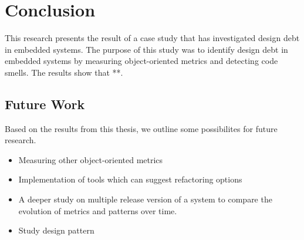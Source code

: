 
\chapter{Conclusion}
This research presents the result of a case study that has investigated design debt in embedded systems. The purpose of this study was to identify design debt in embedded systems by measuring object-oriented metrics and detecting code smells. The results show that **. 

\section{Future Work}
Based on the results from this thesis, we outline some possibilites for future research.

\begin{itemize}
	\item Measuring other object-oriented metrics
	\item Implementation of tools which can suggest refactoring options
	\item A deeper study on multiple release version of a system to compare the evolution of metrics and patterns over time.
	\item Study design pattern
\end{itemize}
